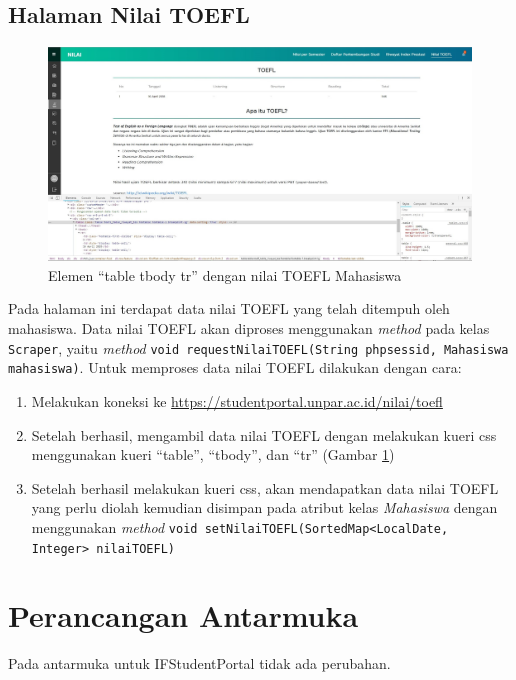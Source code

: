 \subsection{Halaman Nilai TOEFL}
		\begin{figure}[H]
			\centering
			\includegraphics[scale=0.3]{Gambar/Nilai_toefl_css}
			\caption{Elemen ``table tbody tr'' dengan nilai TOEFL Mahasiswa}
			\label{pic:nilai_toefl_css}
		\end{figure}
Pada halaman ini terdapat data nilai TOEFL yang telah ditempuh oleh mahasiswa. Data nilai TOEFL akan diproses menggunakan \textit{method} pada kelas \texttt{Scraper}, yaitu \textit{method} \texttt{void requestNilaiTOEFL(String phpsessid, Mahasiswa mahasiswa)}. Untuk memproses data nilai TOEFL dilakukan dengan cara:
\begin{enumerate}
	\item Melakukan koneksi ke \url{https://studentportal.unpar.ac.id/nilai/toefl}
	\item Setelah berhasil, mengambil data nilai TOEFL dengan melakukan kueri css menggunakan kueri ``table'', ``tbody'', dan ``tr'' (Gambar \ref{pic:nilai_toefl_css})
	\item Setelah berhasil melakukan kueri css, akan mendapatkan data nilai TOEFL yang perlu diolah kemudian disimpan pada atribut kelas \textit{Mahasiswa} dengan menggunakan \textit{method} \texttt{void setNilaiTOEFL(SortedMap<LocalDate, Integer> nilaiTOEFL)}
\end{enumerate}

\section{Perancangan Antarmuka}
Pada antarmuka untuk IFStudentPortal tidak ada perubahan.